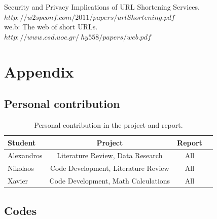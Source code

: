 \documentclass[12pt]{article}
\begin{document}
Security and Privacy Implications of URL Shortening Services.\\
$http://w2spconf.com/2011/papers/urlShortening.pdf$
\\

we.b: The web of short URLs.\\
$http://www.csd.uoc.gr/~hy558/papers/web.pdf$

\newpage
\section{Appendix}

\subsection{Personal contribution}

\begin{center}
\begin{table}
		\begin{tabular}{|l|c|c|c|}
  			\hline
	  		\textbf{Student} & \textbf{Project} & \textbf{Report} \\
	  		\hline
  			Alexandros & Literature Review, Data Research & All \\ 
  			\hline
  			Nikolaos & Code Development, Literature Review & All \\
	  		\hline
  			Xavier & Code Development, Math Calculations & All \\
  			\hline
  		\end{tabular}
	\caption[A table]{Personal contribution in the project and report.}
	
\end{table}
\end{center}

\subsection{Codes}
\end{document}
